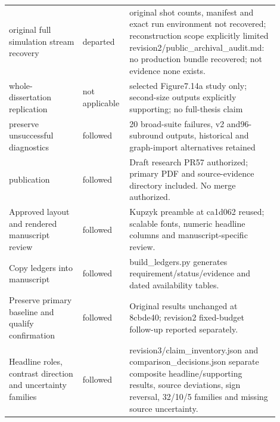 \begin{longtable}{p{0.26\linewidth}p{0.14\linewidth}p{0.5\linewidth}}
original full simulation stream recovery & departed & original shot counts, manifest and exact run environment not recovered; reconstruction scope explicitly limited revision2/public\_archival\_audit.md: no production bundle recovered; not evidence none exists.\\
whole-dissertation replication & not applicable &  selected Figure7.14a study only; second-size outputs explicitly supporting; no full-thesis claim\\
preserve unsuccessful diagnostics & followed &  20 broad-suite failures, v2 and96-subround outputs, historical and graph-import alternatives retained\\
publication & followed &  Draft research PR57 authorized; primary PDF and source-evidence directory included. No merge authorized.\\
Approved layout and rendered manuscript review & followed &  Kupzyk preamble at ca1d062 reused; scalable fonts, numeric headline columns and manuscript-specific review.\\
Copy ledgers into manuscript & followed &  build\_ledgers.py generates requirement/status/evidence and dated availability tables.\\
Preserve primary baseline and qualify confirmation & followed &  Original results unchanged at 8cbde40; revision2 fixed-budget follow-up reported separately.\\
Headline roles, contrast direction and uncertainty families & followed &  revision3/claim\_inventory.json and comparison\_decisions.json separate composite headline/supporting results, source deviations, sign reversal, 32/10/5 families and missing source uncertainty.\\
\bottomrule\end{longtable}\normalsize
